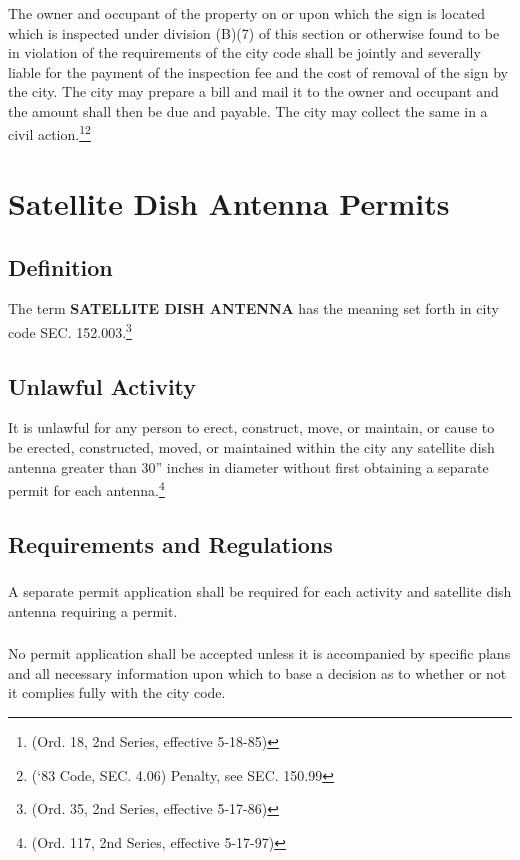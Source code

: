 \subsubsection{}
The owner and occupant of the property on or upon which the sign is located which is inspected under division (B)(7) of this section or otherwise found to be in violation of the requirements of the city code shall be jointly and severally liable for the payment of the inspection fee and the cost of removal of the sign by the city. The city may prepare a bill and mail it to the owner and occupant and the amount shall then be due and payable. The city may collect the same in a civil action.\footnote{(Ord. 18, 2nd Series, effective 5-18-85)}\footnote{(‘83 Code, SEC. 4.06)  Penalty, see SEC. 150.99}
\section{Satellite Dish Antenna Permits}
\subsection{Definition}
The term \textbf{SATELLITE DISH ANTENNA} has the meaning set forth in city code SEC. 152.003.\footnote{(Ord. 35, 2nd Series, effective 5-17-86)}
\subsection{Unlawful Activity}
It is unlawful for any person to erect, construct, move, or maintain, or cause to be erected, constructed, moved, or maintained within the city any satellite dish antenna greater than 30” inches in diameter without first obtaining a separate permit for each antenna.\footnote{(Ord. 117, 2nd Series, effective 5-17-97)}
\subsection{Requirements and Regulations}
\subsubsection{}
A separate permit application shall be required for each activity and satellite dish antenna requiring a permit.
\subsubsection{}
No permit application shall be accepted unless it is accompanied by specific plans and all necessary information upon which to base a decision as to whether or not it complies fully with the city code.
